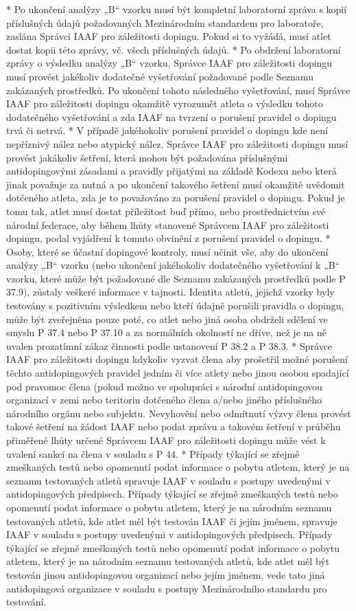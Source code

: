 * Po ukončení analýzy „B“ vzorku musí být kompletní laboratorní zpráva s kopií příslušných údajů požadovaných Mezinárodním standardem pro laboratoře, zaslána Správci IAAF pro záležitosti dopingu. Pokud si to vyžádá, musí atlet dostat kopii této zprávy, vč. všech příslušných údajů.
* Po obdržení laboratorní zprávy o výsledku analýzy „B“ vzorku, Správce IAAF pro záležitosti dopingu musí provést jakékoliv dodatečné vyšetřování požadované podle Seznamu zakázaných prostředků. Po ukončení tohoto následného vyšetřování, musí Správce IAAF pro záležitosti dopingu okamžitě vyrozumět atleta o výsledku tohoto dodatečného vyšetřování a zda IAAF na tvrzení o porušení pravidel o dopingu trvá či netrvá.
* V případě jakéhokoliv porušení pravidel o dopingu kde není nepříznivý nález nebo atypický nález, Správce IAAF pro záležitosti dopingu musí provést jakákoliv šetření, která mohou být požadována příslušnými antidopingovými zásadami a pravidly přijatými na základě Kodexu nebo která jinak považuje za nutná a po ukončení takového šetření musí okamžitě uvědomit dotčeného atleta, zda je to považováno za porušení pravidel o dopingu. Pokud je tomu tak, atlet musí dostat příležitost buď přímo, nebo prostřednictvím své národní federace, aby během lhůty stanovené Správcem IAAF pro záležitosti dopingu, podal vyjádření k tomuto obvinění z porušení pravidel o dopingu.
* Osoby, které se účastní dopingové kontroly, musí učinit vše, aby do ukončení analýzy „B“ vzorku (nebo ukončení jakéhokoliv dodatečného vyšetřování k „B“ vzorku, které může být požadované dle Seznamu zakázaných prostředků podle P 37.9), zůstaly veškeré informace v tajnosti. Identita atletů, jejichž vzorky byly testovány s pozitivním výsledkem nebo kteří údajně porušili pravidla o dopingu, může být zveřejněna pouze poté, co atlet nebo jiná osoba obdrželi sdělení ve smyslu P 37.4 nebo P 37.10 a za normálních okolností ne dříve, než je na ně uvalen prozatímní zákaz činnosti podle ustanovení P 38.2 a P 38.3.
* Správce IAAF pro záležitosti dopingu kdykoliv vyzvat člena aby prošetřil možné porušení těchto antidopingových pravidel jedním či více atlety nebo jinou osobou spadající pod pravomoc člena (pokud možno ve spolupráci s národní antidopingovou organizací v zemi nebo teritoriu dotčeného člena a/nebo jiného příslušného národního orgánu nebo subjektu. Nevyhovění nebo odmítnutí výzvy člena provést takové šetření na žádost IAAF nebo podat zprávu a takovém šetření v průběhu přiměřené lhůty určené Správcem IAAF pro záležitosti dopingu může vést k uvalení sankcí na člena v souladu s P 44.
* Případy týkající se zřejmě zmeškaných testů nebo opomenutí podat informace o pobytu atletem, který je na seznamu testovaných atletů spravuje IAAF v souladu s postupy uvedenými v antidopingových předpisech. Případy týkající se zřejmě zmeškaných testů nebo opomenutí podat informace o pobytu atletem, který je na národním seznamu testovaných atletů, kde atlet měl být testován IAAF či jejím jménem, spravuje IAAF v souladu s postupy uvedenými v antidopingových předpisech. Případy týkající se zřejmě zmeškaných testů nebo opomenutí podat informace o pobytu atletem, který je na národním seznamu testovaných atletů, kde atlet měl být testován jinou antidopingovou organizací nebo jejím jménem, vede tato jiná antidopingová organizace v souladu s postupy Mezinárodního standardu pro testování.
